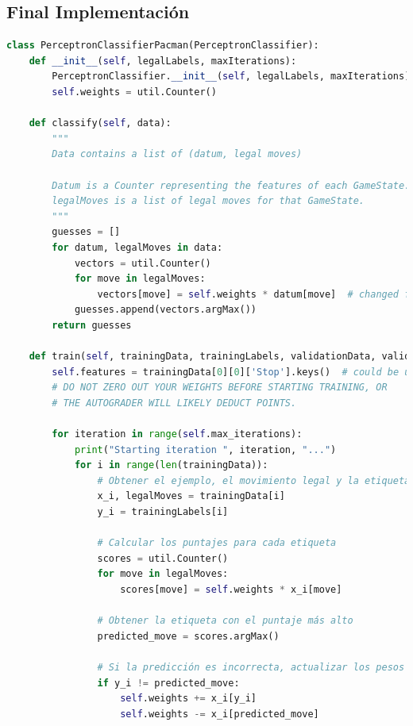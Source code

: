 \documentclass{report}
\begin{document}
      \subsection*{Final Implementación}
        \begin{lstlisting}[language=Python, caption=Implementación final del clonador de comportamiento del pacman]
class PerceptronClassifierPacman(PerceptronClassifier):
    def __init__(self, legalLabels, maxIterations):
        PerceptronClassifier.__init__(self, legalLabels, maxIterations)
        self.weights = util.Counter()

    def classify(self, data):
        """
        Data contains a list of (datum, legal moves)
        
        Datum is a Counter representing the features of each GameState.
        legalMoves is a list of legal moves for that GameState.
        """
        guesses = []
        for datum, legalMoves in data:
            vectors = util.Counter()
            for move in legalMoves:
                vectors[move] = self.weights * datum[move]  # changed from datum to datum[l]
            guesses.append(vectors.argMax())
        return guesses

    def train(self, trainingData, trainingLabels, validationData, validationLabels):
        self.features = trainingData[0][0]['Stop'].keys()  # could be useful later
        # DO NOT ZERO OUT YOUR WEIGHTS BEFORE STARTING TRAINING, OR
        # THE AUTOGRADER WILL LIKELY DEDUCT POINTS.

        for iteration in range(self.max_iterations):
            print("Starting iteration ", iteration, "...")
            for i in range(len(trainingData)):
                # Obtener el ejemplo, el movimiento legal y la etiqueta
                x_i, legalMoves = trainingData[i]
                y_i = trainingLabels[i]
                
                # Calcular los puntajes para cada etiqueta
                scores = util.Counter()
                for move in legalMoves:
                    scores[move] = self.weights * x_i[move]
                
                # Obtener la etiqueta con el puntaje más alto
                predicted_move = scores.argMax()
                
                # Si la predicción es incorrecta, actualizar los pesos
                if y_i != predicted_move:
                    self.weights += x_i[y_i]
                    self.weights -= x_i[predicted_move]
        \end{lstlisting}
\end{document}
